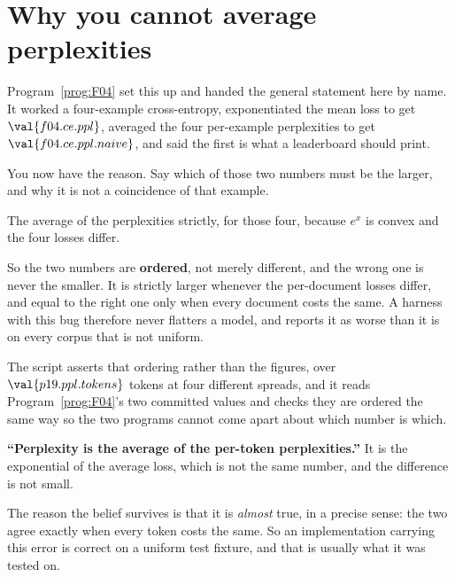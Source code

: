 \section{Why you cannot average perplexities}
\label{sec:P19-perplexity}

\begin{fr}
Program~\ref{prog:F04} set this up and handed the general statement here by
name. It worked a four-example cross-entropy, exponentiated the mean loss to
get $\val{f04.ce.ppl}$, averaged the four per-example perplexities to get
$\val{f04.ce.ppl.naive}$, and said the first is what a leaderboard should
print.

You now have the reason. Say which of those two numbers must be the larger,
and why it is not a coincidence of that example.
\dotline
\nextframe
\end{fr}

\begin{fr}
\begin{ansblock}
The average of the perplexities \dash{} strictly, for those four, because
$e^{x}$ is convex and the four losses differ.
\end{ansblock}

So the two numbers are \textbf{ordered}, not merely different, and the wrong
one is never the smaller. It is strictly larger whenever the per-document
losses differ, and equal to the right one only when every document costs the
same. A harness with this bug therefore never flatters a model, and reports it
as worse than it is on every corpus that is not uniform.

The script asserts that ordering rather than the figures, over
$\val{p19.ppl.tokens}$ tokens at four different spreads, and it reads
Program~\ref{prog:F04}'s two committed values and checks they are ordered the
same way \dash{} so the two programs cannot come apart about which number is
which.
\end{fr}

\begin{fr}
\begin{trapbox}
\textbf{\enquote{Perplexity is the average of the per-token perplexities.}}
It is the exponential of the average loss, which is not the same number, and
the difference is not small.

The reason the belief survives is that it is \emph{almost} true, in a precise
sense: the two agree exactly when every token costs the same. So an
implementation carrying this error is correct on a uniform test fixture, and
that is usually what it was tested on.
\end{trapbox}
\end{fr}

